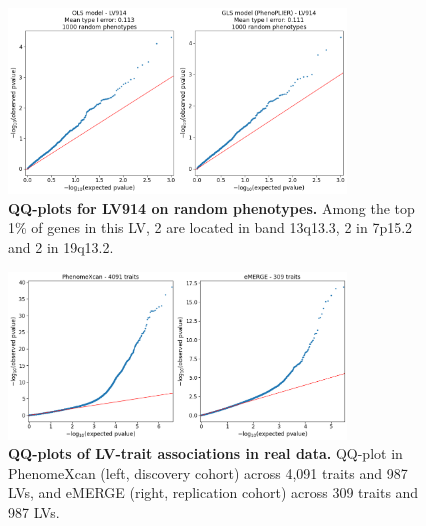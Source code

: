 \documentclass[
  a4paper,
]{article}
\newenvironment{fignos:tagged-figure}[1][]{
  \let\oldfigurename\figurename
  \renewcommand{\figurename}{Supplementary Figure}
}{
  \let\figurename\oldfigurename
}
\begin{document}
\begin{fignos:tagged-figure}[S6]

\begin{figure}
\hypertarget{fig:reg:nulls:qqplot:lv914}{%
\centering
\includegraphics[width=0.8\textwidth,height=\textheight]{images/gls/null_sims/models_lv914.png}
\caption{\textbf{QQ-plots for LV914 on random phenotypes.}
Among the top 1\% of genes in this LV, 2 are located in band 13q13.3, 2 in 7p15.2 and 2 in 19q13.2.}\label{fig:reg:nulls:qqplot:lv914}
}
\end{figure}

\end{fignos:tagged-figure}

\begin{fignos:tagged-figure}[S7]

\begin{figure}
\hypertarget{fig:reg:real:qqplots}{%
\centering
\includegraphics[width=0.8\textwidth,height=\textheight]{images/gls/real_data/qqplots.png}
\caption{\textbf{QQ-plots of LV-trait associations in real data.}
QQ-plot in PhenomeXcan (left, discovery cohort) across 4,091 traits and 987 LVs, and eMERGE (right, replication cohort) across 309 traits and 987 LVs.}\label{fig:reg:real:qqplots}
}
\end{figure}

\end{fignos:tagged-figure}

\clearpage
\end{document}
